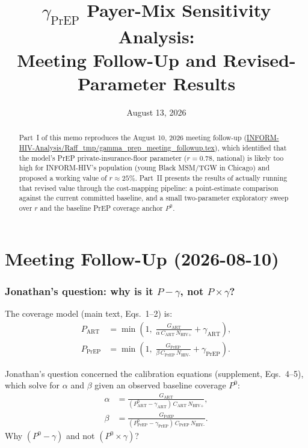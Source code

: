 \documentclass[12pt]{article}
\title{$\gamma_{\text{PrEP}}$ Payer-Mix Sensitivity Analysis:\\[2pt]
       \large Meeting Follow-Up and Revised-Parameter Results}
\date{August 13, 2026}
\begin{document}
\maketitle

\begin{abstract}
\noindent
Part~I of this memo reproduces the August 10, 2026 meeting follow-up
(\url{INFORM-HIV-Analysis/Raff_tmp/gamma_prep_meeting_followup.tex}),
which identified that the model's PrEP private-insurance-floor parameter
($r = 0.78$, national) is likely too high for INFORM-HIV's population
(young Black MSM/TGW in Chicago) and proposed a working value of
$r \approx 25\%$. Part~II presents the results of actually running that
revised value through the cost-mapping pipeline: a point-estimate
comparison against the current committed baseline, and a small two-parameter
exploratory sweep over $r$ and the baseline PrEP coverage anchor $P^0$.
\end{abstract}
\tableofcontents
\bigskip

\part{Meeting Follow-Up (2026-08-10)}
\label{part:meeting}

\section{Jonathan's question: why is it $P - \gamma$, not $P \times \gamma$?}
\label{sec:equation}

The coverage model (main text, Eqs.~1--2) is:
\begin{align}
P_{\text{ART}}  &= \min\!\left(1,\; \frac{G_{\text{ART}}}{\alpha\, C_{\text{ART}}\, N_{\text{HIV+}}} + \gamma_{\text{ART}}\right), \label{eq:PART} \\[4pt]
P_{\text{PrEP}} &= \min\!\left(1,\; \frac{G_{\text{PrEP}}}{\beta\, C_{\text{PrEP}}\, N_{\text{HIV-}}} + \gamma_{\text{PrEP}}\right). \label{eq:PPrEP}
\end{align}

Jonathan's question concerned the calibration equations (supplement, Eqs.~4--5),
which solve for $\alpha$ and $\beta$ given an observed baseline coverage
$P^{0}$:
\begin{align}
\alpha &= \frac{G_{\text{ART}}}{(P_{\text{ART}}^{0} - \gamma_{\text{ART}})\, C_{\text{ART}}\, N_{\text{HIV+}}}, \label{eq:alpha_cal} \\[4pt]
\beta  &= \frac{G_{\text{PrEP}}}{(P_{\text{PrEP}}^{0} - \gamma_{\text{PrEP}})\, C_{\text{PrEP}}\, N_{\text{HIV-}}}. \label{eq:beta_cal}
\end{align}
Why $(P^{0} - \gamma)$ and not $(P^{0}\times \gamma)$?
\end{document}
